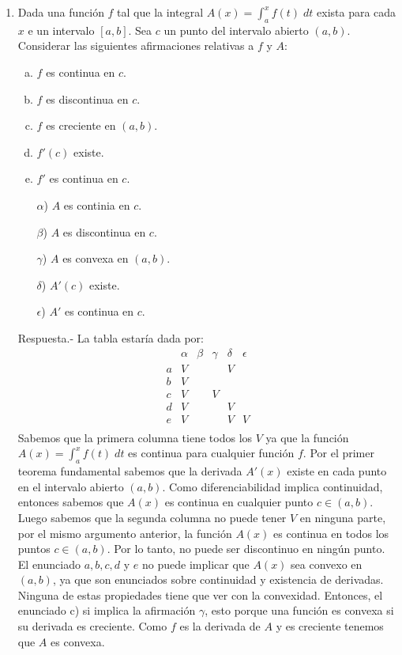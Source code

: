 \begin{enumerate}[\bfseries 1.]
    \item Dada una función $f$ tal que la integral $A(x)=\int_a^x f(t)\; dt$ exista para cada $x$ e un intervalo $[a,b]$. Sea $c$ un punto del intervalo abierto $(a,b)$. Considerar las siguientes afirmaciones relativas a $f$ y $A$:
    \begin{multicols}{2}
	\begin{enumerate}[a)]
	    \item $f$ es continua en $c$.
	    \item $f$ es discontinua en $c$.
	    \item $f$ es creciente en $(a,b)$.
	    \item $f'(c)$ existe.
	    \item $f'$ es continua en $c$.
	\end{enumerate}
	\begin{enumerate}
	    \item[$\alpha$)] $A$ es continia en $c$.
	    \item[$\beta$)] $A$ es discontinua en $c$.
	    \item[$\gamma$)] $A$ es convexa en $(a,b)$.
	    \item[$\delta$)] $A'(c)$ existe.
	    \item[$\epsilon$)] $A'$ es continua en $c$.
	\end{enumerate}
    \end{multicols}
    \vspace{.4cm}
	Respuesta.-\; La tabla estaría dada por:
	$$\begin{array}{c|ccccc}
	    &\alpha&\beta&\gamma&\delta&\epsilon\\
	    \hline
	    a&V&&&V&\\
	    b&V&&&&\\
	    c&V&&V&&\\
	    d&V&&&V&\\
	    e&V&&&V&V\\
	\end{array}$$
	Sabemos que la primera columna tiene todos los $V$ ya que la función $A(x)=\int_a^x f(t)\; dt$ es continua para cualquier función $f$. Por el primer teorema fundamental sabemos que la derivada $A'(x)$ existe en cada punto en el intervalo abierto $(a,b)$. Como diferenciabilidad implica continuidad, entonces sabemos que $A(x)$ es continua en cualquier punto $c\in(a,b)$.\\
	Luego sabemos que la segunda columna no puede tener $V$ en ninguna parte, por el mismo argumento anterior, la función $A(x)$ es continua en todos los puntos $c\in (a,b)$. Por lo tanto, no puede ser discontinuo en ningún punto.\\
	El enunciado $a,b,c,d$ y $e$ no puede implicar que $A(x)$ sea convexo en $(a,b)$, ya que son enunciados sobre continuidad y existencia de derivadas. Ninguna de estas propiedades tiene  que ver con la convexidad. Entonces, el enunciado c) si implica la afirmación $\gamma$, esto porque una función es convexa si su derivada es creciente. Como $f$ es la derivada de $A$ y es creciente tenemos que $A$ es convexa.

\end{enumerate}


